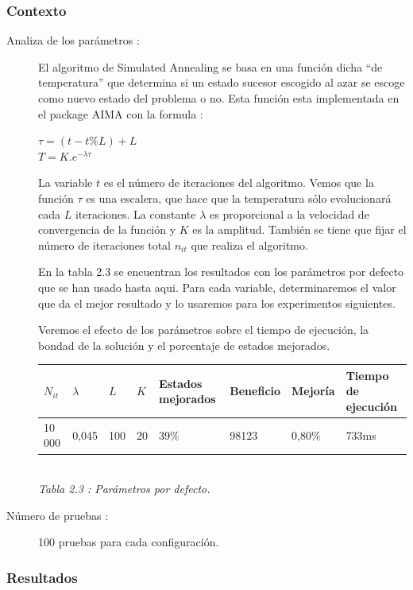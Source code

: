 \documentclass{article}
\begin{document}
\subsubsection{Contexto}
\begin{description}
\item[Analiza de los parámetros :] El algoritmo de Simulated Annealing se basa
en una función dicha ``de temperatura'' que determina si un estado sucesor
escogido al azar se escoge como nuevo estado del problema o no. Esta función
esta implementada en el package AIMA con la formula :
\begin{center}
$\tau = (t-t\%L)+L$\\
$T = K.e^{-\lambda \tau}$
\end{center}
La variable $t$ es el número de iteraciones del algoritmo. Vemos que la función
$\tau$ es una escalera, que hace que la temperatura sólo evolucionará cada $L$
iteraciones. La constante $\lambda$ es proporcional a la velocidad de
convergencia de la función y $K$ es la amplitud. También se tiene que fijar el
número de iteraciones total $n_{it}$ que realiza el algoritmo.

En la tabla 2.3 se encuentran los resultados con los parámetros por defecto que
se han usado hasta aqui. Para cada variable, determinaremos el valor que da el
mejor resultado y lo usaremos para los experimentos siguientes.

Veremos el efecto de los parámetros sobre el tiempo de ejecución, la bondad de
la solución y el porcentaje de estados mejorados.

\begin{center}
\begin{tabular}{|l|l|l|l||l|l|l|l|}
\hline
$N_{it}$ & $\lambda$ & $L$ & $K$ & Estados mejorados & Beneficio & Mejoría & 
Tiempo de ejecución\\
\hline
10 000 & 0,045 & 100 & 20 & 39\% & 98123 & 0,80\% & 733ms\\
\hline
\end{tabular}\\
{\it Tabla 2.3 : Parámetros por defecto.}
\end{center}
\item[Número de pruebas :] 100 pruebas para cada configuración.
\end{description}

\subsubsection{Resultados}
\end{document}
